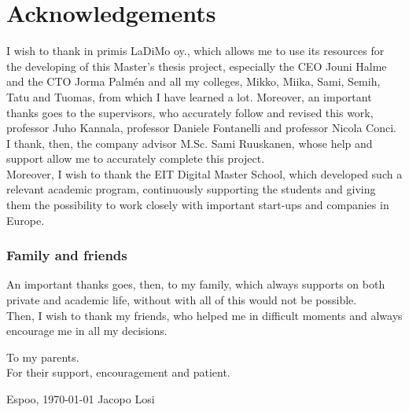 \documentclass[12pt,a4paper,oneside,pdftex]{report}
\newcommand{\DATE}{\today}
\newcommand{\AUTHOR}{Jacopo Losi}
\begin{document}

\chapter*{Acknowledgements}

I wish to thank in primis LaDiMo oy., which allows me to use its resources for the developing of this Master's thesis project, especially the CEO Jouni Halme and the CTO Jorma Palmén and all my colleges, Mikko, Miika, Sami, Semih, Tatu and Tuomas, from which I have learned a lot.
Moreover, an important thanks goes to the supervisors, who accurately follow and revised this work, professor Juho Kannala, professor Daniele Fontanelli and professor Nicola Conci.
I thank, then, the company advisor M.Sc. Sami Ruuskanen, whose help and support allow me to accurately complete this project.\\
Moreover, I wish to thank the EIT Digital Master School, which developed such a relevant academic program, continuously supporting the students and giving them the possibility to work closely with important start-ups and companies in Europe.

\subsection*{Family and friends}
An important thanks goes, then, to my family, which always supports on both private and academic life, without with all of this would not be possible.\\
Then, I wish to thank my friends, who helped me in difficult moments and always encourage me in all my decisions.\\

\begin{flushright}
To my parents.\\
For their support, encouragement and patient. 
\end{flushright} 

\vfill

\noindent Espoo, \DATE
\vskip 5mm
\noindent\AUTHOR

\cleardoublepage

\end{document}
